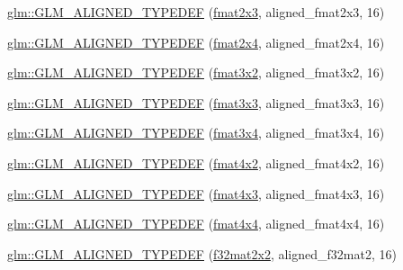 \begin{DoxyCompactItemize}
\item 
\mbox{\hyperlink{group__gtx__type__aligned_ga0743b4f4f69a3227b82ff58f6abbad62}{glm\+::\+G\+L\+M\+\_\+\+A\+L\+I\+G\+N\+E\+D\+\_\+\+T\+Y\+P\+E\+D\+EF}} (\mbox{\hyperlink{group__gtc__type__precision_ga872da486765a299d84e9e8e6232ed306}{fmat2x3}}, aligned\+\_\+fmat2x3, 16)
\item 
\mbox{\hyperlink{group__gtx__type__aligned_ga1a76b325fdf70f961d835edd182c63dd}{glm\+::\+G\+L\+M\+\_\+\+A\+L\+I\+G\+N\+E\+D\+\_\+\+T\+Y\+P\+E\+D\+EF}} (\mbox{\hyperlink{group__gtc__type__precision_gabaf7537f5284456254b1da1cd6fd2b78}{fmat2x4}}, aligned\+\_\+fmat2x4, 16)
\item 
\mbox{\hyperlink{group__gtx__type__aligned_ga4b4e181cd041ba28c3163e7b8074aef0}{glm\+::\+G\+L\+M\+\_\+\+A\+L\+I\+G\+N\+E\+D\+\_\+\+T\+Y\+P\+E\+D\+EF}} (\mbox{\hyperlink{group__gtc__type__precision_gaed9c8fe9d2e094bf3bc7c606bbae1a6b}{fmat3x2}}, aligned\+\_\+fmat3x2, 16)
\item 
\mbox{\hyperlink{group__gtx__type__aligned_ga27b13f465abc8a40705698145e222c3f}{glm\+::\+G\+L\+M\+\_\+\+A\+L\+I\+G\+N\+E\+D\+\_\+\+T\+Y\+P\+E\+D\+EF}} (\mbox{\hyperlink{group__gtc__type__precision_ga5bf6f06e3cac1ed82489f858a0816aaa}{fmat3x3}}, aligned\+\_\+fmat3x3, 16)
\item 
\mbox{\hyperlink{group__gtx__type__aligned_ga2608d19cc275830a6f8c0b6405625a4f}{glm\+::\+G\+L\+M\+\_\+\+A\+L\+I\+G\+N\+E\+D\+\_\+\+T\+Y\+P\+E\+D\+EF}} (\mbox{\hyperlink{group__gtc__type__precision_gab2daf8468a8b9343c065816df07e29fe}{fmat3x4}}, aligned\+\_\+fmat3x4, 16)
\item 
\mbox{\hyperlink{group__gtx__type__aligned_ga93f09768241358a287c4cca538f1f7e7}{glm\+::\+G\+L\+M\+\_\+\+A\+L\+I\+G\+N\+E\+D\+\_\+\+T\+Y\+P\+E\+D\+EF}} (\mbox{\hyperlink{group__gtc__type__precision_ga279cf309f0098c3d26ce88fe8a26375a}{fmat4x2}}, aligned\+\_\+fmat4x2, 16)
\item 
\mbox{\hyperlink{group__gtx__type__aligned_ga7c117e3ecca089e10247b1d41d88aff9}{glm\+::\+G\+L\+M\+\_\+\+A\+L\+I\+G\+N\+E\+D\+\_\+\+T\+Y\+P\+E\+D\+EF}} (\mbox{\hyperlink{group__gtc__type__precision_ga0ab797a258612fe48345951a0bdd6b8c}{fmat4x3}}, aligned\+\_\+fmat4x3, 16)
\item 
\mbox{\hyperlink{group__gtx__type__aligned_ga07c75cd04ba42dc37fa3e105f89455c5}{glm\+::\+G\+L\+M\+\_\+\+A\+L\+I\+G\+N\+E\+D\+\_\+\+T\+Y\+P\+E\+D\+EF}} (\mbox{\hyperlink{group__gtc__type__precision_gaeda4baa9a8e3113ff879dd5e7bdf5334}{fmat4x4}}, aligned\+\_\+fmat4x4, 16)
\item 
\mbox{\hyperlink{group__gtx__type__aligned_ga65ff0d690a34a4d7f46f9b2eb51525ee}{glm\+::\+G\+L\+M\+\_\+\+A\+L\+I\+G\+N\+E\+D\+\_\+\+T\+Y\+P\+E\+D\+EF}} (\mbox{\hyperlink{group__gtc__type__precision_ga3c0ffd3a47ae47ff05d5ea6e90825caa}{f32mat2x2}}, aligned\+\_\+f32mat2, 16)

\end{DoxyCompactItemize}
